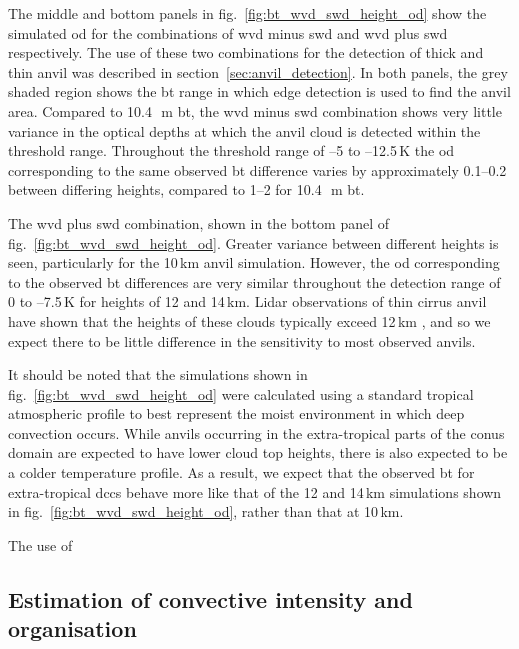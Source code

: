 The middle and bottom panels in fig.~\ref{fig:bt_wvd_swd_height_od} show the simulated \acrshort{od} for the combinations of \acrshort{wvd} minus \acrshort{swd} and \acrshort{wvd} plus \acrshort{swd} respectively.
The use of these two combinations for the detection of thick and thin anvil was described in section~\ref{sec:anvil_detection}.
In both panels, the grey shaded region shows the \acrshort{bt} range in which edge detection is used to find the anvil area.
Compared to 10.4\,\unit{\mu m} \acrshort{bt}, the \acrshort{wvd} minus \acrshort{swd} combination shows very little variance in the optical depths at which the anvil cloud is detected within the threshold range.
Throughout the threshold range of --5 to --12.5\,\unit{K} the \acrshort{od} corresponding to the same observed \acrshort{bt} difference varies by approximately 0.1--0.2 between differing heights, compared to 1--2 for 10.4\,\unit{\mu m} \acrshort{bt}.

The \acrshort{wvd} plus \acrshort{swd} combination, shown in the bottom panel of fig.~\ref{fig:bt_wvd_swd_height_od}.
Greater variance between different heights is seen, particularly for the 10\,\unit{km} anvil simulation.
However, the \acrshort{od} corresponding to the observed \acrshort{bt} differences are very similar throughout the detection range of 0 to --7.5\,\unit{K} for heights of 12 and 14\,\unit{km}.
Lidar observations of thin cirrus anvil have shown that the heights of these clouds typically exceed 12\,\unit{km} \citep{wall_observational_2020, horner_evolution_2023}, and so we expect there to be little difference in the sensitivity to most observed anvils.

It should be noted that the simulations shown in fig.~\ref{fig:bt_wvd_swd_height_od} were calculated using a standard tropical atmospheric profile to best represent the moist environment in which deep convection occurs.
While anvils occurring in the extra-tropical parts of the \acrshort{conus} domain are expected to have lower cloud top heights, there is also expected to be a colder temperature profile.
As a result, we expect that the observed \acrshort{bt} for extra-tropical \acrshort{dcc}s behave more like that of the 12 and 14\,\unit{km} simulations shown in fig.~\ref{fig:bt_wvd_swd_height_od}, rather than that at 10\,\unit{km}.

The use of 



\subsection{Estimation of convective intensity and organisation}


